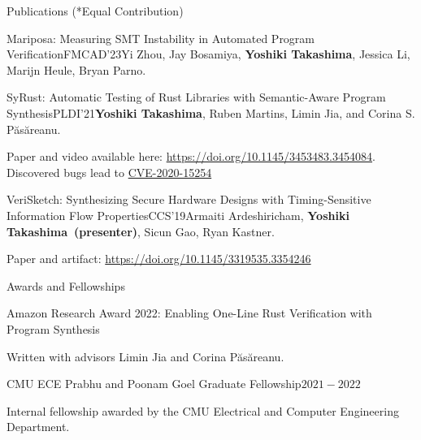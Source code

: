 \documentclass{resume} %
\begin{document}
\begin{rSection}{Publications {\footnotesize (*Equal Contribution)}}
\begin{rPubsection}{Mariposa: Measuring SMT Instability in Automated
      Program Verification}{FMCAD'23}{Yi Zhou, Jay Bosamiya, \textbf{Yoshiki
      Takashima}, Jessica Li, Marijn Heule, Bryan Parno.}{}
  \end{rPubsection}

  \begin{rPubsection}{SyRust: Automatic Testing of Rust Libraries with
      Semantic-Aware Program Synthesis}{PLDI'21}{\textbf{Yoshiki Takashima},
      Ruben Martins, Limin Jia, and Corina S. P\u{a}s\u{a}reanu.}{}

    {\footnotesize Paper and video available here:
      \href{https://doi.org/10.1145/3453483.3454084}
      {https://doi.org/10.1145/3453483.3454084}. Discovered bugs lead
      to
      \href{https://nvd.nist.gov/vuln/detail/CVE-2020-15254}{CVE-2020-15254}}
  \end{rPubsection}

  \begin{rPubsection}{VeriSketch: Synthesizing Secure Hardware Designs
      with Timing-Sensitive Information Flow
      Properties}{CCS'19}{Armaiti Ardeshiricham, \textbf{Yoshiki
        Takashima~(presenter)}, Sicun Gao, Ryan Kastner.}{}

    {\footnotesize Paper and artifact:
      \href{https://dl.acm.org/doi/abs/10.1145/3319535.3354246}
      {https://doi.org/10.1145/3319535.3354246}}
  \end{rPubsection}
\end{rSection}

\begin{rSection}{Awards and Fellowships}

  \begin{rSubsection}{Amazon Research Award 2022: Enabling One-Line Rust
      Verification with Program Synthesis}{}{}{}
  \item Written with advisors Limin Jia and Corina P\u{a}s\u{a}reanu.
  \end{rSubsection}

  \begin{rSubsection}{CMU ECE Prabhu and Poonam Goel Graduate
      Fellowship}{$2021 - 2022$}{}{}
  \item Internal fellowship awarded by the CMU Electrical and Computer
    Engineering Department.
  \end{rSubsection}
\end{rSection}
\end{document}
